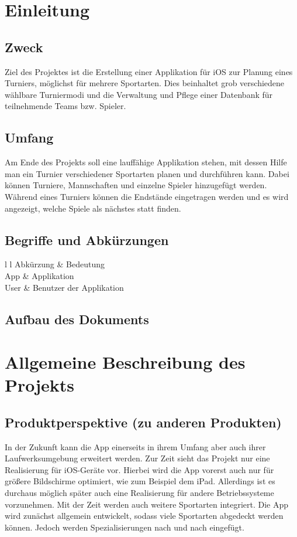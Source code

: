 \chapter{Einleitung}
\section{Zweck}
Ziel des Projektes ist die Erstellung einer Applikation für iOS zur Planung eines Turniers, möglichst für mehrere Sportarten. Dies beinhaltet grob verschiedene wählbare Turniermodi und die Verwaltung und Pflege einer Datenbank für teilnehmende Teams bzw. Spieler.

\section{Umfang}
Am Ende des Projekts soll eine lauffähige Applikation stehen, mit dessen Hilfe man ein Turnier verschiedener Sportarten planen und durchführen kann. Dabei können Turniere, Mannschaften und einzelne Spieler hinzugefügt werden.
Während eines Turniers können die Endstände eingetragen werden und es wird angezeigt, welche Spiele als nächstes statt finden.

\section{Begriffe und Abkürzungen}
	\begin{table}{l l}
		Abkürzung & Bedeutung\\
		App & Applikation\\
		User & Benutzer der Applikation\\
	\end{table}

\section{Aufbau des Dokuments}

\chapter{Allgemeine Beschreibung des Projekts}
\section{Produktperspektive (zu anderen Produkten)}
In der Zukunft kann die App einerseits in ihrem Umfang aber auch ihrer Laufwerksumgebung erweitert werden.
Zur Zeit sieht das Projekt nur eine Realisierung für iOS-Geräte vor. Hierbei wird die App vorerst auch nur für größere Bildschirme optimiert, wie zum Beispiel dem iPad. Allerdings ist es durchaus möglich später auch eine Realisierung für andere Betriebssysteme vorzunehmen.
Mit der Zeit werden auch weitere Sportarten integriert. Die App wird zunächst allgemein entwickelt, sodass viele Sportarten abgedeckt werden können. Jedoch werden Spezialisierungen nach und nach eingefügt.
 
